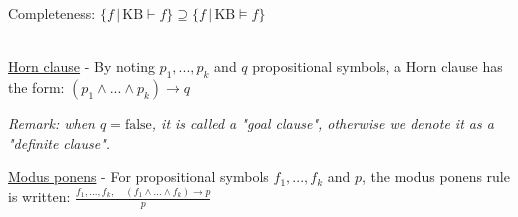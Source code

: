 \documentclass[4pt,landscape]{article}
\begin{document}
\begin{multicols*}{4}
 {\tiny \textrm{Completeness:}
 $\{f \, | \, \textrm{KB}\vdash f\}\supseteq\{f \, | \, \textrm{KB}\models f\}$}\par
 {\color{yellow} \hrulefill}\\
 {\tiny \underline{Horn clause} - By noting $p_1,...,p_k$ and $q$ propositional symbols, a Horn clause has the form: $(p_1\wedge...\wedge p_k)\longrightarrow q$}\par
 {\tiny \textit{Remark: when $q=\textrm{false}$, it is called a "goal clause", otherwise we denote it as a "definite clause".}}\par
 {\tiny \underline{Modus ponens} - For propositional symbols $f_1,...,f_k$ and $p$, the modus ponens rule is written: $\frac{f_1,...,f_k,\quad (f_1\wedge...\wedge f_k)\longrightarrow p}{p}$}\par
 


\end{multicols*}
\end{document}
